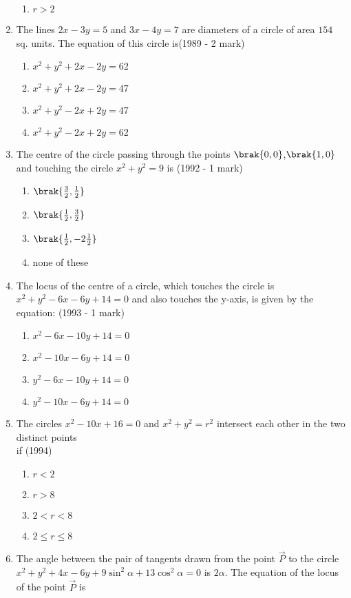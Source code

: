 \begin{enumerate}
\begin{enumerate}
    	\item $r>2$
    \end{enumerate}
    \item The lines $2x-3y=5$ and $3x-4y=7$ are diameters of a circle of area $154$ sq. units. The equation of this circle is\hfill {(1989 - 2 mark)}
    \begin{enumerate}
    	\item $x^{2}+y^{2}+2x-2y=62$
    	\item $x^{2}+y^{2}+2x-2y=47$
    	\item $x^{2}+y^{2}-2x+2y=47$
    	\item $x^{2}+y^{2}-2x+2y=62$
    \end{enumerate}
    \item The centre of the circle passing through the points $\brak{0,0}$,$\brak{1,0}$ and touching the circle $x^{2}+y^{2}=9$ is
    \hfill {(1992 - 1 mark)}
    \begin{enumerate}
    	\item $\brak{\frac{3}{2},\frac{1}{2}}$
    	\item $\brak{\frac{1}{2},\frac{3}{2}}$
    	\item $\brak{\frac{1}{2},-2\frac{1}{2}}$
    	\item none of these
    \end{enumerate}
    \item The locus of the centre of a circle, which touches the circle is $x^{2}+y^{2}-6x-6y+14=0$ and also touches the y-axis, is given by the equation: \hfill {(1993 - 1 mark)}
    \begin{enumerate}
    	\item $x^{2}-6x-10y+14=0$
    	\item $x^{2}-10x-6y+14=0$
    	\item $y^{2}-6x-10y+14=0$
    	\item $y^{2}-10x-6y+14=0$
    \end{enumerate}
    \item The circles $x^{2}-10x+16=0$ and $x^{2}+y^{2}=r^{2}$ intersect each other in the two distinct points\\ if
    \hfill {(1994)}
    \begin{enumerate}
    	\item $r<2$
    	\item $r>8$
    	\item $2<r<8$
    	\item $2\leq r\leq8$
    \end{enumerate}
    \item The angle between the pair of tangents drawn from the point $\vec{P}$ to the circle $x^{2}+y^{2}+4x-6y+9\sin^{2}{\alpha}+13\cos^{2}{\alpha}=0$ is $2\alpha$. The equation of the locus of the point $\vec{P}$ is

\end{enumerate}
